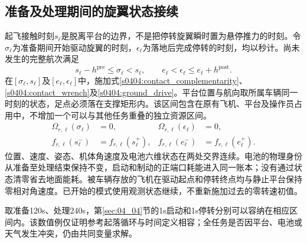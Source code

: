 \subsection{准备及处理期间的旋翼状态接续}
起飞接触时刻$s_\ell$是脱离平台的边界，不是把停转旋翼瞬时置为悬停推力的时刻。令$\sigma_\ell$为准备期间开始驱动旋翼的时刻，$\epsilon_\ell$为落地后完成停转的时刻，均以秒计。尚未发生的完整航次满足
\begin{equation}
 s_\ell-h^{\mathrm{pre}}\le\sigma_\ell<s_\ell,
 \qquad e_\ell<\epsilon_\ell\le e_\ell+h^{\mathrm{post}}.
 \label{s0504:ground_mode_intervals}
\end{equation}
在$[\sigma_\ell,s_\ell]$及$[e_\ell,\epsilon_\ell]$中，施加式\eqref{s0404:contact_complementarity}、\eqref{s0404:contact_wrench}及\eqref{s0404:ground_drive}。平台位置与航向取所属车辆同一时刻的状态，足点必须落在支撑矩形内。该区间包含在原有飞机、平台及操作员占用中，不增加一个可以与其他任务重叠的独立资源区间。
\begin{align}
 \Omega_{r,\ell}(\sigma_\ell)&=0,
 &\Omega_{r,\ell}(\epsilon_\ell)&=0,\\
 f_{r,\ell}(s_\ell^-)&=f_{r,\ell}(s_\ell^+),
 &f_{r,\ell}(e_\ell^-)&=f_{r,\ell}(e_\ell^+).
 \label{s0504:rotor_handoff}
\end{align}
位置、速度、姿态、机体角速度及电池六维状态在两处交界连续。电池的物理身份从准备至处理结束保持不变，启动和制动的正端口耗能进入同一账本；没有通过状态清零省去地面能耗。被车辆存放的飞机在驱动起点和停转终点均与静止平台保持零相对角速度。已开始的模式使用观测状态继续，不重新施加过去的零转速初值。

取准备120s、处理240s，第\ref{sec:04_04}节的1s启动和1s停转分别可以容纳在相应区间内。该数值例仅证明参考起落循环与时间定义相容；全任务是否因平台、电池或天气发生冲突，仍由共同变量求解。

